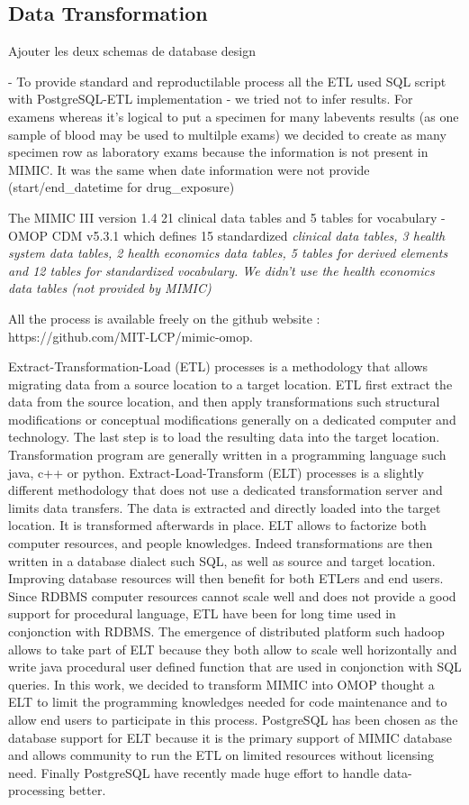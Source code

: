 \subsection{Data Transformation}

Ajouter les deux schemas de database design

- To provide standard and reproductilable process all the ETL used SQL script
  with PostgreSQL-ETL implementation
- we tried  not to infer results. For examens whereas it's logical to put a
  specimen for many labevents results (as one sample of blood may be used to
  multilple exams) we decided to create as many specimen row as laboratory
  exams because the information is not present in MIMIC. It was the same when
  date information were not provide (start/end_datetime for drug_exposure)

The MIMIC III version 1.4 21 clinical data tables and 5 tables for vocabulary
- OMOP CDM v5.3.1 which defines 15 standardized \it{clinical} data tables, 3
\it{health} system data tables, 2 \it{health economics} data tables, 5 tables
for \it{derived} elements and 12 tables for standardized \it{vocabulary}. 
We didn’t use the health economics data tables (not provided by MIMIC)

All the process is available freely on the github website :
https://github.com/MIT-LCP/mimic-omop.

Extract-Transformation-Load (ETL) processes is a methodology that allows
migrating data from a source location to a target location. ETL first extract
the data from the source location, and then apply transformations such
structural modifications or conceptual modifications generally on a dedicated
computer and technology. The last step is to load the resulting data into the
target location. Transformation program are generally written in a programming
language such java, c++ or python.
Extract-Load-Transform (ELT) processes is a slightly different methodology that
does not use a dedicated transformation server and limits data transfers. The
data is extracted and directly loaded into the target location. It is
transformed afterwards in place. ELT allows to factorize both computer
resources, and people knowledges. Indeed transformations are then written in a
database dialect such SQL, as well as source and target location. Improving
database resources will then benefit for both ETLers and end users. Since RDBMS
computer resources cannot scale well and does not provide a good support for
procedural language, ETL have been for long time used in conjonction with
RDBMS. The emergence of distributed platform such hadoop allows to take part
of ELT because they both allow to scale well horizontally and write java
procedural user defined function that are used in conjonction with SQL queries.
In this work, we decided to transform MIMIC into OMOP thought a ELT to limit
the programming knowledges needed for code maintenance and to allow end users
to participate in this process. PostgreSQL has been chosen as the database
support for ELT because it is the primary support of MIMIC database and allows
community to run the ETL on limited resources without licensing need. Finally
PostgreSQL have recently made huge effort to handle data-processing better.

